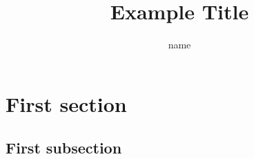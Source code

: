\documentclass{article}
\author{name}
\title{Example Title}
\begin{document}
  \maketitle
  \section{First section}
  \subsection{First subsection}
\end{document}
